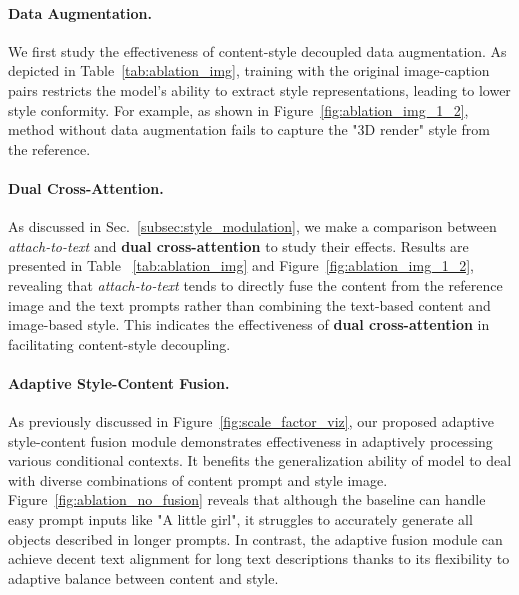 
\paragraph{Data Augmentation.}
We first study the effectiveness of content-style decoupled data augmentation. As depicted in Table~\ref{tab:ablation_img}, training with the original image-caption pairs restricts the model's ability to extract style representations, leading to lower style conformity. For example, as shown in Figure~\ref{fig:ablation_img_1_2}, method without data augmentation fails to capture the "3D render" style from the reference.


\paragraph{Dual Cross-Attention.} 
As discussed in Sec.~\ref{subsec:style_modulation},  we make a comparison between \textit{attach-to-text} and \textbf{dual cross-attention} to study their effects. Results are presented in Table ~\ref{tab:ablation_img} and Figure~\ref{fig:ablation_img_1_2}, revealing that \textit{attach-to-text} tends to directly fuse the content from the reference image and the text prompts rather than combining the text-based content and image-based style. This indicates the effectiveness of \textbf{dual cross-attention} in facilitating content-style decoupling.


\paragraph{Adaptive Style-Content Fusion.}
As previously discussed in Figure~\ref{fig:scale_factor_viz}, our proposed adaptive style-content fusion module demonstrates effectiveness in adaptively processing various conditional contexts. It benefits the generalization ability of model to deal with diverse combinations of content prompt and style image. Figure~\ref{fig:ablation_no_fusion} reveals that although the baseline can handle easy prompt inputs like "A little girl", it struggles to accurately generate all objects described in longer prompts. In contrast, the adaptive fusion module can achieve decent text alignment for long text descriptions thanks to its flexibility to adaptive balance between content and style.


